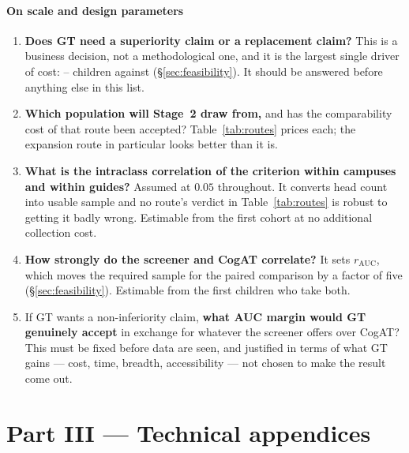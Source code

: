\documentclass[11pt,a4paper]{article}
\begin{document}
\subsection*{On scale and design parameters}
\begin{enumerate}[leftmargin=1.6em,itemsep=0.15em,start=20]
\item \textbf{Does GT need a superiority claim or a replacement claim?} This is
a business decision, not a methodological one, and it is the largest single
driver of cost: \NsupHi{}--\NsupLo{} children against \NnonInfHi{}
(\S\ref{sec:feasibility}). It should be answered before anything else in this
list.
\item \textbf{Which population will Stage~2 draw from,} and has the
comparability cost of that route been accepted? Table~\ref{tab:routes} prices
each; the expansion route in particular looks better than it is.
\item \textbf{What is the intraclass correlation of the criterion within
campuses and within guides?} Assumed at $0.05$ throughout. It converts head
count into usable sample and no route's verdict in Table~\ref{tab:routes} is
robust to getting it badly wrong. Estimable from the first cohort at no
additional collection cost.
\item \textbf{How strongly do the screener and CogAT correlate?} It sets
$r_{\mathrm{AUC}}$, which moves the required sample for the paired comparison by
a factor of five (\S\ref{sec:feasibility}). Estimable from the first children who
take both.
\item If GT wants a non-inferiority claim, \textbf{what AUC margin would GT
genuinely accept} in exchange for whatever the screener offers over CogAT? This
must be fixed before data are seen, and justified in terms of what GT gains ---
cost, time, breadth, accessibility --- not chosen to make the result come out.
\end{enumerate}

\clearpage
\part*{Part III --- Technical appendices}


\end{document}
